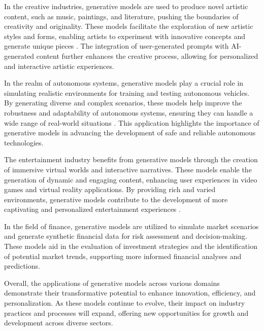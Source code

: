 In the creative industries, generative models are used to produce novel artistic content, such as music, paintings, and literature, pushing the boundaries of creativity and originality. These models facilitate the exploration of new artistic styles and forms, enabling artists to experiment with innovative concepts and generate unique pieces \cite{palmini2024patternscreativityuserinput}. The integration of user-generated prompts with AI-generated content further enhances the creative process, allowing for personalized and interactive artistic experiences.



In the realm of autonomous systems, generative models play a crucial role in simulating realistic environments for training and testing autonomous vehicles. By generating diverse and complex scenarios, these models help improve the robustness and adaptability of autonomous systems, ensuring they can handle a wide range of real-world situations \cite{wang2023environmenttransformerpolicyoptimization}. This application highlights the importance of generative models in advancing the development of safe and reliable autonomous technologies.



The entertainment industry benefits from generative models through the creation of immersive virtual worlds and interactive narratives. These models enable the generation of dynamic and engaging content, enhancing user experiences in video games and virtual reality applications. By providing rich and varied environments, generative models contribute to the development of more captivating and personalized entertainment experiences \cite{tao2024rolecraftglmadvancingpersonalizedroleplaying}.



In the field of finance, generative models are utilized to simulate market scenarios and generate synthetic financial data for risk assessment and decision-making. These models aid in the evaluation of investment strategies and the identification of potential market trends, supporting more informed financial analyses and predictions.



Overall, the applications of generative models across various domains demonstrate their transformative potential to enhance innovation, efficiency, and personalization. As these models continue to evolve, their impact on industry practices and processes will expand, offering new opportunities for growth and development across diverse sectors.



